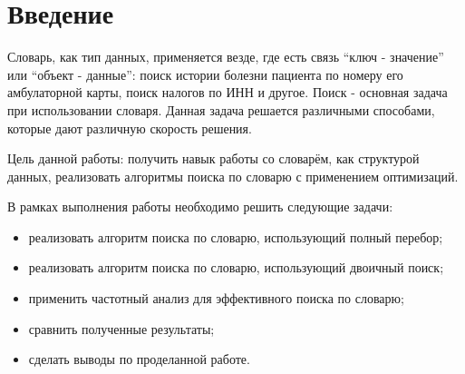 \chapter*{Введение}

Словарь, как тип данных, применяется везде, где есть связь ``ключ - значение'' или ``объект - данные'': поиск истории болезни пациента по номеру его амбулаторной карты, поиск налогов по ИНН и другое. Поиск - основная задача при использовании словаря. Данная задача решается различными способами, которые дают различную скорость решения.

Цель данной работы: получить навык работы со словарём, как структурой данных, реализовать алгоритмы поиска по словарю с применением оптимизаций.

В рамках выполнения работы необходимо решить следующие задачи:
\begin{itemize}
	\item реализовать алгоритм поиска по словарю, использующий полный перебор;
	\item реализовать алгоритм поиска по словарю, использующий двоичный поиск;
	\item применить частотный анализ для эффективного поиска по словарю;
    \item сравнить полученные результаты;
    \item сделать выводы по проделанной работе.
\end{itemize}
